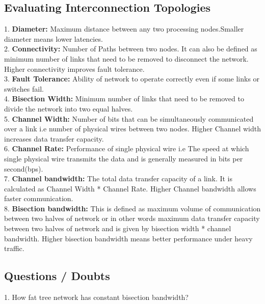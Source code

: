 \documentclass{article}
\begin{document}
\subsection*{Evaluating Interconnection Topologies}
1. \textbf{Diameter: } Maximum distance between any two processing nodes.Smaller diameter means lower latencies. \\
2. \textbf{Connectivity: } Number of Paths between two nodes. It can also be defined as minimum number of links that need to be removed to disconnect the network. Higher connectivity improves fault tolerance.\\
3. \textbf{Fault Tolerance: } Ability of network to operate correctly even if some links or switches fail. \\
4. \textbf{Bisection Width: } Minimum number of links that need to be removed to divide the network into two equal halves. \\
5. \textbf{Channel Width: } Number of bits that can be simultaneously communicated over a link i.e number of physical wires between two nodes. Higher Channel width increases data transfer capacity. \\
6. \textbf{Channel Rate: } Performance of single physical wire i.e The speed at which single physical wire transmits the data and is generally measured in bits per second(bps). \\
7. \textbf{Channel bandwidth: } The total data transfer capacity of a link. It is calculated as Channel Width * Channel Rate. Higher Channel bandwidth allows faster communication. \\
8. \textbf{Bisection bandwidth: } This is defined as maximum volume of communication between two halves of network or in other words maximum data transfer capacity between two halves of network and is given by bisection width * channel bandwidth. Higher bisection bandwidth means better performance under heavy traffic. \\

\subsection*{Questions / Doubts }
1. How fat tree network has constant bisection bandwidth? \\
\end{document}
